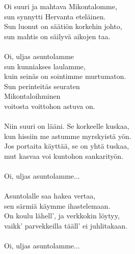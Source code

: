 
            Oi suuri ja mahtava Mikontalomme, \\
            sun synnytti Hervanta eteläinen. \\
            Sun luonut on säätiön korkehin johto, \\
            sun mahtis on säilyvä aikojen taa. \\
\hspace{10mm} \\
            Oi, uljas asuntolamme \\
            sun kunniakses laulamme, \\
            kuin seinäs on sointimme murtumaton. \\
            Sun perinteitäs seuraten \\
            Mikontaloihminen \\
            voitosta voittohon astuva on. \\
\hspace{10mm} \\
            Niin suuri on lääni. Se korkeelle kuskaa, \\
            kun hissiin me astumme myrskyistä yön. \\
            Jos portaita käyttää, se on yhtä tuskaa, \\
            mut kasvaa voi kuntohon sankarityön. \\
\hspace{10mm} \\
            Oi, uljas asuntolamme... \\
\hspace{10mm} \\
            Asuntolalle saa hakea vertaa, \\
            sen särmiä käymme ihastelemaan. \\
            On koulu lähell’, ja verkkokin löytyy, \\
            vaikk’ parvekkeilla tääll’ ei juhlitakaan. \\
\hspace{10mm} \\
            Oi, uljas asuntolamme... \\
